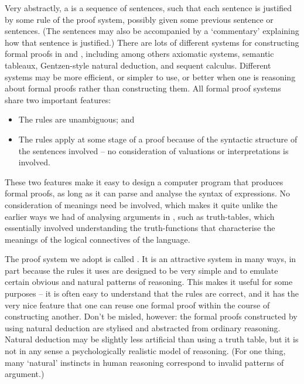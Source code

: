 Very abstractly, a  is a sequence of sentences, such that each sentence is justified by some rule of the proof system, possibly given some previous sentence or sentences. (The sentences may also be accompanied by a `commentary' explaining how that sentence is justified.) There are lots of different systems for constructing formal proofs in \TFL and \FOL, including among others axiomatic systems, semantic tableaux, Gentzen-style natural deduction, and sequent calculus. Different systems may be more efficient, or simpler to use, or better when one is reasoning about formal proofs rather than constructing them. 
 All formal proof systems share two important features: \begin{itemize}
	\item The rules are unambiguous; and
	\item The rules apply at some stage of a proof because of the syntactic structure of the sentences involved – no consideration of valuations or interpretations is involved.
\end{itemize} These two features make it easy to design a computer program that produces formal proofs, as long as it can parse and analyse the syntax of expressions. No consideration of meanings need be involved, which makes it quite unlike the earlier ways we had of analysing arguments in \TFL, such as truth-tables, which essentially involved understanding the truth-functions that characterise the meanings of the logical connectives of the language.

The proof system we adopt is called . It is an attractive system in many ways, in part because the rules it uses are designed to be very simple and to emulate certain obvious and natural patterns of reasoning. This makes it useful for some purposes – it is often easy to understand that the rules are correct, and it has the very nice feature that one can reuse one formal proof within the course of constructing another. Don't be misled, however: the formal proofs constructed by using natural deduction are stylised and abstracted from ordinary reasoning. Natural deduction may be slightly less artificial than using a truth table, but it is not in any sense a psychologically realistic model of reasoning. (For one thing, many `natural' instincts in human reasoning correspond to invalid patterns of argument.)

